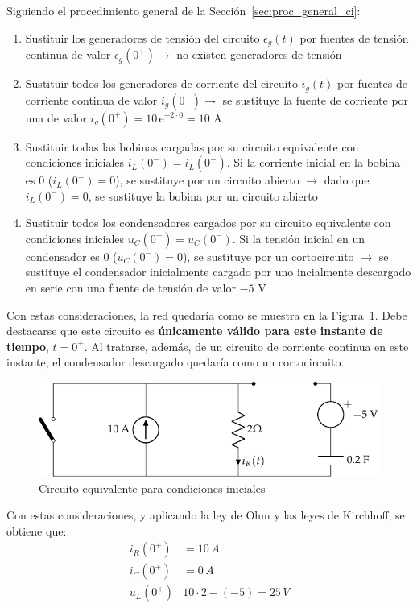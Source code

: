 \begin{example}
  Siguiendo el procedimiento general de la
  Sección~\ref{sec:proc_general_ci}:
  \begin{enumerate}
  \item Sustituir los generadores de tensión del circuito
    $\epsilon_g(t)$ por fuentes de tensión continua de valor
    $\epsilon_g(0^+) \rightarrow$ no existen generadores de tensión
  \item Sustituir todos los generadores de corriente del circuito
    $i_g(t)$ por fuentes de corriente continua de valor
    $i_g(0^+)\rightarrow$ se sustituye la fuente de corriente por una
    de valor $i_g(0^+)=10\,\mathrm{e}^{-2\cdot 0}=10$ A
  \item Sustituir todas las bobinas cargadas por su circuito
    equivalente con condiciones iniciales $i_L(0^-)=i_L(0^+)$. Si la
    corriente inicial en la bobina es 0 ($i_L(0^-)=0$), se sustituye
    por un circuito abierto $\rightarrow$ dado que $i_L(0^-)=0$, se
    sustituye la bobina por un circuito abierto
  \item Sustituir todos los condensadores cargados por su circuito
    equivalente con condiciones iniciales $u_C(0^+)=u_C(0^-)$. Si la
    tensión inicial en un condensador es 0 ($u_C(0^-)=0$), se
    sustituye por un cortocircuito $\rightarrow$ se sustituye el
    condensador inicialmente cargado por uno incialmente descargado en
    serie con una fuente de tensión de valor $-5$ V
  \end{enumerate}
  Con estas consideraciones, la red quedaría como se muestra en la
  Figura~\ref{fig:ej_cond_iniciales_0+}. Debe destacarse que este
  circuito es \textbf{únicamente válido para este instante de tiempo},
  $t=0^+$. Al tratarse, además, de un circuito de corriente continua
  en este instante, el condensador descargado quedaría como un
  cortocircuito.
  \begin{figure}[H]
    \centering \includegraphics{../figs/ej_cond_iniciales_0+.pdf}
    \caption{Circuito equivalente para condiciones iniciales}
    \label{fig:ej_cond_iniciales_0+}
  \end{figure}
	
  Con estas consideraciones, y aplicando la ley de Ohm y las leyes de
  Kirchhoff, se obtiene que:
  \begin{align*}
    i_R(0^+)&=10\,A\\
    i_C(0^+)&=0\,A\\
    u_L(0^+)&10\cdot 2 - (-5)=25\,V
  \end{align*}
	
\end{example}

